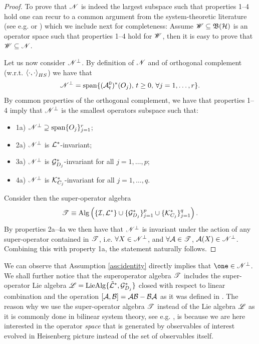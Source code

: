 \documentclass[aihp,12pt]{imsart}
\begin{document}
\begin{proof}
To prove that $\mathscr{N}$ is indeed the largest subspace such that properties 1--4 hold one can recur to a common argument from the system-theoretic literature (see e.g. \cite[Property 2.6.8]{marrobasile} or \cite{kalman,kalman1969topics,wonham,vanhandel2008stabilityquantummarkovfilters}) which we include next for completeness: Assume $\mathscr{W}\subseteq\mathfrak{B}(\mathcal{H})$ is an operator space such that properties 1--4 hold for $\mathscr{W}$, then it is easy to prove that $\mathscr{W}\subseteq\mathscr{N}$. 

Let us now consider $\mathscr{N}^\perp$. By definition of $\mathscr{N}$ and of orthogonal complement (w.r.t. $\left< \cdot,\cdot \right>_{HS}$) we have that 
\[\mathscr{N}^\perp = {\rm span}\{({\mathcal A_t^0})^* (O_j), \, t\geq0,\,\forall j=1,\dots,r \}.\]
By common properties of the orthogonal complement, we have that properties 1--4 imply that $\mathscr{N}^\perp$ is the smallest operators subspace such that: \begin{itemize}\item1a) $\mathscr{N}^\perp \supseteq {\rm span}\{O_j\}_{j=1}^r$; \item 2a) \(\mathscr{N}^\perp\) is $\mathcal{L}^*$-invariant; \item 3a) \(\mathscr{N}^\perp\) is $\mathcal{G}_{D_j}^*$-invariant for all $j=1,\dots,p$; 
\item 4a) \(\mathscr{N}^\perp\) is $\mathcal{K}_{C_j}^*$-invariant for all $j=1,\dots,q$.
\end{itemize}
Consider then the super-operator algebra $$\mathscr{T} \equiv {\rm Alg}\left(\{\mathcal{I}, {\mathcal{L}}^*\}\cup\{\mathcal{G}_{D_j}^*\}_{j=1}^p \cup\{\mathcal{K}_{C_j}^*\}_{j=1}^q \right).$$ By properties 2a--4a we then have that $\mathscr{N}^\perp$ is invariant under the action of any super-operator contained in $\mathscr{T}$, i.e. $\forall X\in\mathscr{N}^\perp$, and $\forall\mathcal{A}\in\mathscr{T}$, $\mathcal{A}(X)\in\mathscr{N}^\perp$. Combining this with property 1a, the statement naturally follows.
\end{proof}


We can observe that Assumption \ref{ass:identity} directly implies that $\one\in\Ns^\perp$. 
We shall further notice that the superoperator algebra $\mathscr{T}$ includes the super-operator Lie algebra $\mathscr{L} = {\rm LieAlg}\{\Tilde{\mathcal{L}}^*,\mathcal{G}_{D_j}^*\}$ closed with respect to linear combination and the operation $[\mathcal{A},\mathcal{B}] = \mathcal{A}\mathcal{B}-\mathcal{B}\mathcal{A}$ as it was defined in \cite{amini2019estimation}. The reason why we use the super-operator algebra $\mathscr{T}$ instead of the Lie algebra $\mathscr{L}$ as it is commonly done in bilinear system theory, see e.g. \cite{elliott2009bilinear}, is because we are here interested in the operator {\em space} that is generated by observables of interest evolved in Heisenberg picture instead of the set of observables itself. 
\end{document}
